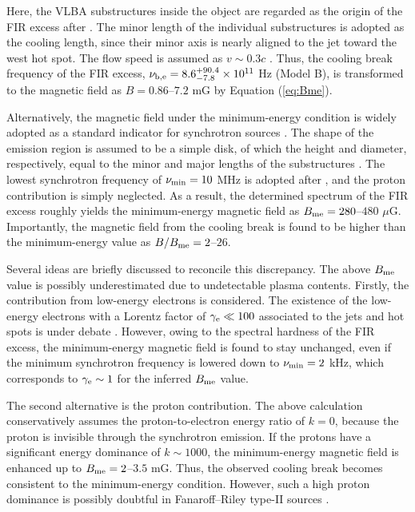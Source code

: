 \documentclass[twocolumn]{aastex631}
\begin{document}
Here, the VLBA substructures inside the object 
are regarded as the origin of the FIR excess 
after \citet{isobe2017,isobe2020}.
The minor length of the individual substructures \citep[$28$--$58$ pc;][]{tingay2008}
is adopted as the cooling length,
since their minor axis is nearly aligned to the jet 
toward the west hot spot. 
The flow speed is assumed as $v\sim0.3c$ \citep{kino2004}.
Thus, the cooling break frequency of the FIR excess,
$\nu_{\rm b,e} = 8.6_{-7.8}^{+90.4} \times 10^{11}$ Hz (Model B),
is transformed to the magnetic field as $B=0.86$--$7.2$ mG
by Equation (\ref{eq:Bme}).

Alternatively, 
the magnetic field under the minimum-energy condition 
is widely adopted as a standard indicator
for synchrotron sources \citep{miley1980}. 
The shape of the emission region is assumed to be a simple disk, 
of which the height and diameter, respectively,
equal to the minor and major lengths of the substructures \citep[$87$--$170$ pc for the latter;][]{tingay2008}.
The lowest synchrotron frequency 
of $\nu_{\rm min} = 10$ MHz is adopted after \citet{miley1980},
and the proton contribution is simply neglected.
As a result, the determined spectrum of the FIR excess 
roughly yields the minimum-energy magnetic field 
as $B_{\rm me} = 280$--$480$ $\mu$G.
Importantly, the magnetic field from the cooling break 
is found to be higher than the minimum-energy value
as $B/B_{\rm me} = 2$--$26$.

Several ideas are briefly discussed to reconcile this discrepancy. 
The above $B_{\rm me}$ value is possibly underestimated 
due to undetectable plasma contents.
Firstly, the contribution from low-energy electrons is considered. 
The existence of the low-energy electrons 
with a Lorentz factor of $\gamma_{\rm e} \ll 100$ 
associated to the jets and hot spots 
is under debate \citep[e.g.,][]{brunetti2001}.
However, owing to the spectral hardness of the FIR excess,
the minimum-energy magnetic field is found to stay unchanged,
even if the minimum synchrotron frequency is 
lowered down to $\nu_{\rm min}=2$ kHz, 
which corresponds to $\gamma_{\rm e} \sim 1$ for 
the inferred $B_{\rm me}$ value.

The second alternative is the proton contribution. 
The above calculation conservatively assumes 
the proton-to-electron energy ratio of $k=0$,
because the proton is invisible through the synchrotron emission.
If the protons have a significant energy dominance of $k\sim1000$,
the minimum-energy magnetic field is enhanced 
up to $B_{\rm me} =2$--$3.5$ mG. 
Thus, the observed cooling break becomes 
consistent to the minimum-energy condition.
However, such a high proton dominance is possibly doubtful 
in Fanaroff–Riley type-II sources \citep[e.g.,][]{kawakatsu2016,kino2012}.
\end{document}
